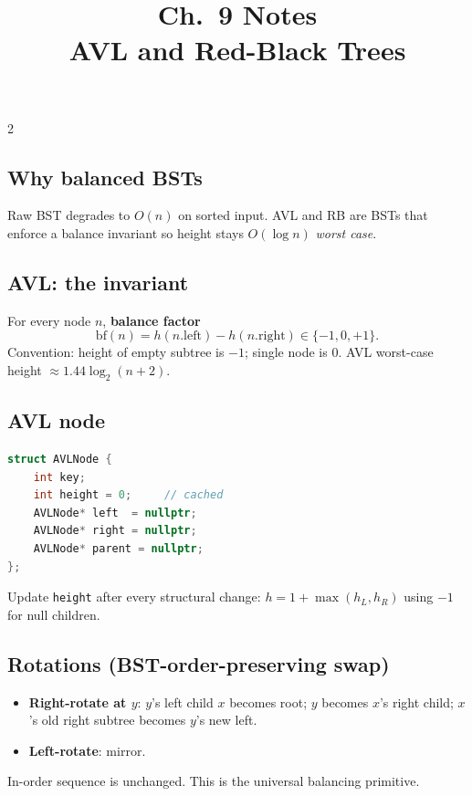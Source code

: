 \documentclass[10pt]{article}
\title{Ch.~9 Notes\\\large AVL and Red-Black Trees}
\author{}
\date{}
\begin{document}
\maketitle
\vspace{-2em}

\begin{multicols}{2}

\subsection*{Why balanced BSTs}
Raw BST degrades to $O(n)$ on sorted input. AVL and RB are
BSTs that enforce a balance invariant so height stays
$O(\log n)$ \emph{worst case}.

\subsection*{AVL: the invariant}
For every node $n$, \textbf{balance factor}
\[
\mathrm{bf}(n) = h(n.\mathrm{left}) - h(n.\mathrm{right}) \in \{-1, 0, +1\}.
\]
Convention: height of empty subtree is $-1$; single node is $0$.
AVL worst-case height $\approx 1.44 \log_2(n+2)$.

\subsection*{AVL node}
\begin{lstlisting}[language=C++]
struct AVLNode {
    int key;
    int height = 0;     // cached
    AVLNode* left  = nullptr;
    AVLNode* right = nullptr;
    AVLNode* parent = nullptr;
};
\end{lstlisting}
Update \texttt{height} after every structural change:
$h = 1 + \max(h_L, h_R)$ using $-1$ for null children.

\subsection*{Rotations (BST-order-preserving swap)}
\begin{itemize}
    \item \textbf{Right-rotate at $y$}: $y$'s left child $x$ becomes
    root; $y$ becomes $x$'s right child; $x$'s old right subtree
    becomes $y$'s new left.
    \item \textbf{Left-rotate}: mirror.
\end{itemize}
In-order sequence is unchanged. This is the universal balancing
primitive.


\end{multicols}
\end{document}
